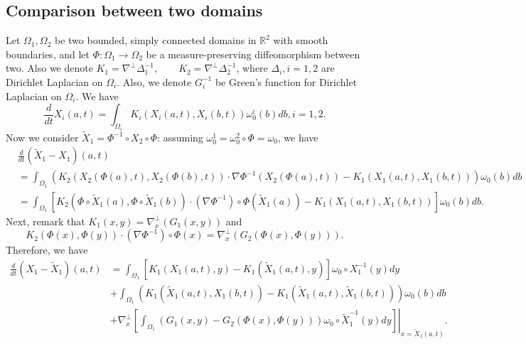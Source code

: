\documentclass[12pt]{article}
\begin{document}
\subsection{Comparison between two domains}
Let $\Omega_1, \Omega_2$ be two bounded, simply connected domains in $\mathbb{R}^2$ with smooth boundaries, and let $\Phi: \Omega_1 \rightarrow \Omega_2$ be a measure-preserving diffeomorphism between two. Also we denote 
$K_1 = \nabla^\perp \Delta_1^{-1}, \qquad K_2 = \nabla^\perp \Delta_2 ^{-1}$, where $\Delta_i, i=1, 2 $ are Dirichlet Laplacian on $\Omega_i$. Also, we denote $G_i^{-1}$ be Green's function for Dirichlet Laplacian on $\Omega_i$. We have
\begin{equation*}
\frac{d}{dt} X_i (a, t) = \int_{\Omega_i} K_i (X_i (a, t), X_i (b,t) ) \omega_0 ^i (b) db, i=1, 2.
\end{equation*}
Now we consider $\tilde{X}_1 = \Phi^{-1} \circ X_2 \circ \Phi$: assuming $\omega_0 ^1 = \omega_0^2 \circ \Phi = \omega_0$, we have
\begin{equation}
\begin{split}
&\frac{d}{dt} (\tilde{X}_1  - X_1) (a,t) \\
&= \int_{\Omega_1} \left (K_2 ( X_2 ( \Phi(a), t) , X_2 (\Phi(b), t) ) \cdot \nabla \Phi^{-1} (X_2 (\Phi (a), t) ) - K_1 (X_1 (a,t) , X_1 (b,t) ) \right ) \omega_0 (b) db \\
&= \int_{\Omega_1} \left [ K_2 ( \Phi \circ \tilde{X}_1 (a), \Phi \circ \tilde{X}_1 (b) ) \cdot (\nabla \Phi^{-1}) \circ \Phi (\tilde{X}_1 (a) ) - K_1 (X_1(a, t) , X_1 (b,t) )  \right ] \omega_0 (b) db.
\end{split}
\end{equation}
Next, remark that $K_1(x,y) = \nabla_x^{\perp} (G_1 (x,y) )$ and 
\begin{equation*}
K_2 (\Phi(x), \Phi(y) ) \cdot (\nabla \Phi^{-1} ) \circ \Phi (x) = \nabla_x^\perp (G_2 (\Phi(x), \Phi(y) ) ).
\end{equation*}
Therefore, we have
\begin{equation}
\begin{split}
\frac{d}{dt} (X_1 - \tilde{X}_1 )(a,t) &= \int_{\Omega_1} [ K_1 (X_1 (a,t), y) - K_1 (\tilde{X}_1 (a,t) , y)  ] \omega_0 \circ X_1^{-1} (y) dy\\
&+ \int_{\Omega_1} \left (K_1 (\tilde{X}_1 (a,t), X_1 (b,t) ) - K_1 (\tilde{X}_1 (a,t), \tilde{X}_1 (b,t) ) \right )  \omega_0 (b) db \\
&+ \left. \nabla_x^{\perp} \left [ \int_{\Omega_1} \left (G_1 (x,y)  - G_2 (\Phi(x), \Phi(y) ) \right ) \omega_0 \circ \tilde{X}_1^{-1} (y)    dy \right ] \right |_{x =\tilde{X}_1 (a,t) }.
\end{split}
\end{equation}
\end{document}
